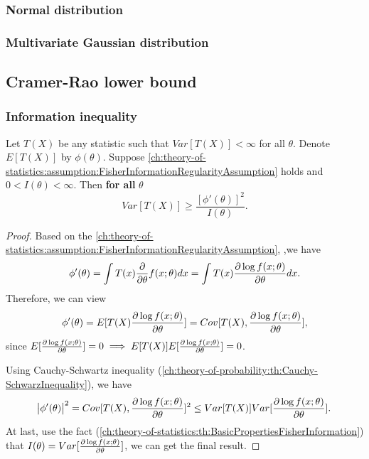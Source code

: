 \begin{refsection}
\subsubsection{Normal distribution}

\begin{lemma}
	
\end{lemma}


\subsubsection{Multivariate Gaussian distribution}

\subsection{Cramer-Rao lower bound}
\subsubsection{Information inequality}

\begin{theorem}
Let $T(X)$ be any statistic such that $Var[T(X)] < \infty$ for all $\theta$. Denote $E[T(X)]$ by $\phi(\theta)$. Suppose \autoref{ch:theory-of-statistics:assumption:FisherInformationRegularityAssumption} holds and $0 < I(\theta) < \infty$. Then \textbf{for all} $\theta$
$$Var[T(X)] \geq \frac{[\phi'(\theta)]^2}{I(\theta)}.$$	
\end{theorem}
\begin{proof}
Based on the \autoref{ch:theory-of-statistics:assumption:FisherInformationRegularityAssumption}, ,we have
$$\phi'(\theta) = \int T(x)\frac{\partial }{\partial \theta} f(x;\theta) dx = \int T(x)\frac{\partial \log f(x;\theta) }{\partial \theta}  dx.$$
Therefore, we can view
$$\phi'(\theta) = E[T(X)\frac{\partial \log f(x;\theta) }{\partial \theta}] = Cov[T(X),\frac{\partial \log f(x;\theta) }{\partial \theta}],$$
since $E[\frac{\partial \log f(x;\theta) }{\partial \theta}] = 0 \implies E[T(X)]E[\frac{\partial \log f(x;\theta) }{\partial \theta}] = 0$.

Using Cauchy-Schwartz inequality (\autoref{ch:theory-of-probability:th:Cauchy-SchwarzInequality}), we have
$$\abs{\phi'(\theta)}^2 = Cov[T(X),\frac{\partial \log f(x;\theta) }{\partial \theta}]^2 \leq Var[T(X)]Var[\frac{\partial \log f(x;\theta) }{\partial \theta}].$$
At last, use the fact (\autoref{ch:theory-of-statistics:th:BasicPropertiesFisherInformation}) that $I(\theta) = Var[\frac{\partial \log f(x;\theta) }{\partial \theta}]$, we can get the final result. 	
\end{proof}




\end{refsection}
